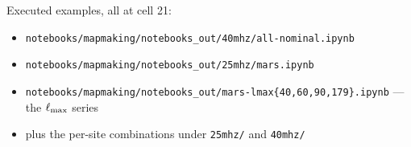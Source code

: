 \documentclass[
  11pt,
]{article}
\providecommand{\tightlist}{%
  \setlength{\itemsep}{0pt}\setlength{\parskip}{0pt}}
\begin{document}
Executed examples, all at cell 21:

\begin{itemize}
\tightlist
\item
  \texttt{notebooks/mapmaking/notebooks\_out/40mhz/all-nominal.ipynb}
\item
  \texttt{notebooks/mapmaking/notebooks\_out/25mhz/mars.ipynb}
\item
  \texttt{notebooks/mapmaking/notebooks\_out/mars-lmax\{40,60,90,179\}.ipynb}
  --- the \(\ell_{\rm max}\) series
\item
  plus the per-site combinations under \texttt{25mhz/} and
  \texttt{40mhz/}
\end{itemize}
\end{document}
